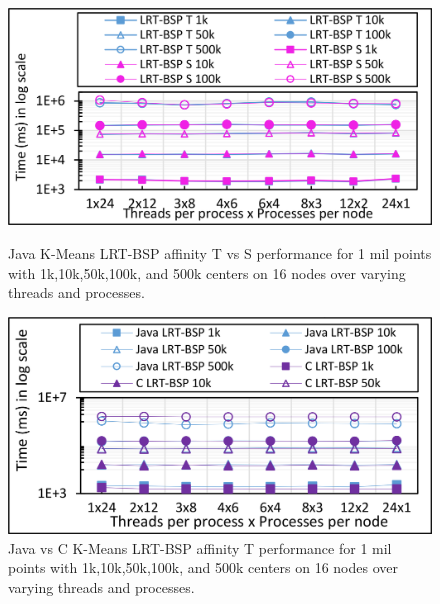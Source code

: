 \documentclass[10pt, conference, compsocconf]{IEEEtran}
\begin{document}
\begin{figure}[!htb]
    \begin{minipage}{0.49\textwidth}
        \centering
        \includegraphics[width=1\columnwidth]{images/fig_kmeans_1mil_varying_centers_BSP_T_vs_BSP_S_Java}
		\caption{Java K-Means \ac{LRT-BSP} affinity T vs S performance for 1 mil points with 1k,10k,50k,100k, and 500k centers on 16 nodes over varying threads and processes.}
		\label{fig:images/fig_kmeans_1mil_varying_centers_BSP_T_vs_BSP_S_Java}
    \end{minipage}
    \hspace{1.4mm}
    \begin{minipage}{0.49\textwidth}
        \centering
        \includegraphics[width=1\columnwidth]{images/fig_kmeans_1mil_varying_centers_BSP_T_C_vs_Java}
		\caption{Java vs C K-Means \ac{LRT-BSP} affinity T performance for 1 mil points with 1k,10k,50k,100k, and 500k centers on 16 nodes over varying threads and processes.}
		\label{fig:images/fig_kmeans_1mil_varying_centers_BSP_T_C_vs_Java}
    \end{minipage}   
\end{figure}
\end{document}
